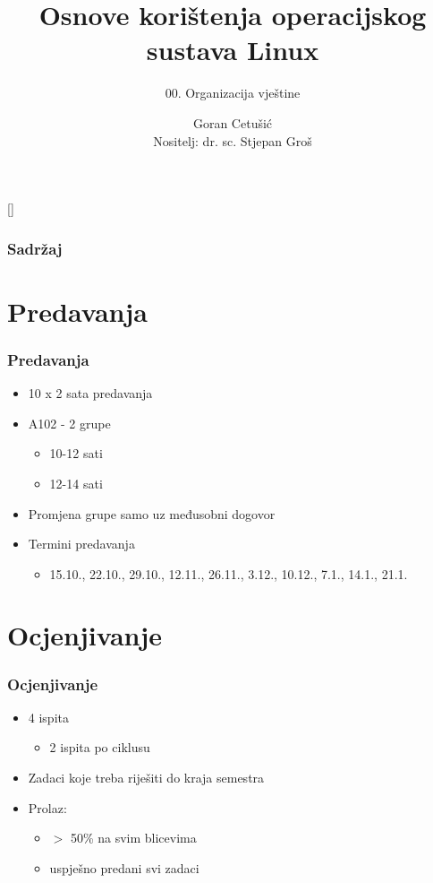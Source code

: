 \documentclass{beamer}
\title{Osnove korištenja operacijskog sustava Linux}
\subtitle{00. Organizacija vještine}
\author[Goran Cetušić]{Goran Cetušić\\{\small Nositelj: dr. sc. Stjepan Groš}}
\institute[FER]{Sveučilište u Zagrebu \\
				Fakultet elektrotehnike i računarstva}
\date{\todayiso}
\begin{document}
{
[] %

\begin{frame}
\maketitle
\end{frame}
}

\begin{frame}
\frametitle{Sadržaj}
\tableofcontents
\end{frame}

\section{Predavanja}
\begin{frame}[t]
\frametitle{Predavanja}
\begin{itemize}
	\item 10 x 2 sata predavanja
	\item A102 - 2 grupe
	\begin{itemize}
		\item 10-12 sati
		\item 12-14 sati
	\end{itemize}
	\item Promjena grupe samo uz međusobni dogovor
	\item Termini predavanja
	\begin{itemize}
		\item 15.10., 22.10., 29.10., 12.11., 26.11., 3.12., 10.12., 7.1., 14.1., 21.1.
	\end{itemize}
\end{itemize}
\end{frame}

\section{Ocjenjivanje}
\begin{frame}[t]
\frametitle{Ocjenjivanje}
\begin{itemize}
	\item 4 ispita
	\begin{itemize}
		\item 2 ispita po ciklusu
	\end{itemize}
	\item Zadaci koje treba riješiti do kraja semestra
	\item Prolaz:
	\begin{itemize}
		\item $>$ 50\% na svim blicevima
		\item uspješno predani svi zadaci
	\end{itemize}
\end{itemize}
\end{frame}
\end{document}
